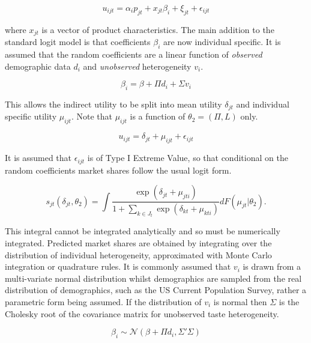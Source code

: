 \documentclass[parskip=half]{scrartcl}
\begin{document}
\begin{equation}
u_{ijt} = \alpha_i p_{jt} + x_{jt} \beta_i + \xi_{jt} + \epsilon_{ijt}
\end{equation}

where \(x_{jt}\) is a vector of product characteristics. The main addition to the standard logit model is that coefficients \(\beta_i\) are now individual specific. It is assumed that the random coefficients are a linear function of \emph{observed} demographic data \(d_i\) and \emph{unobserved} heterogeneity \(v_i\).

\begin{equation}
\beta_i = \beta + \Pi d_i + \Sigma v_i
\end{equation}

This allows the indirect utility to be split into mean utility \(\delta_{jt}\) and individual specific utility \(\mu_{ijt}\). Note that \(\mu_{ijt}\) is a function of \(\theta_2 = (\Pi, L)\) only.

\begin{equation}
u_{ijt} = \delta_{jt} + \mu_{ijt} + \epsilon_{ijt}
\end{equation}

It is assumed that \(\epsilon_{ijt}\) is of Type I Extreme Value, so that conditional on the random coefficients market shares follow the usual logit form.

\begin{equation}
\label{eq:market_share_integral}
s_{jt}(\delta_{jt}, \theta_2) = \int \frac{\exp(\delta_{jt} + \mu_{jti})}{1 + \sum_{k \in J_t} \exp(\delta_{kt} + \mu_{kti})} dF(\mu_{jt} | \theta_2).
\end{equation}

This integral cannot be integrated analytically and so must be numerically integrated. Predicted market shares are obtained by integrating over the distribution of individual heterogeneity, approximated with Monte Carlo integration or quadrature rules. It is commonly assumed that \(v_i\) is drawn from a multi-variate normal distribution whilst demographics are sampled from the real distribution of demographics, such as the US Current Population Survey, rather a parametric form being assumed. If the distribution of \(v_i\) is normal then \(\Sigma\) is the Cholesky root of the covariance matrix for unobserved taste heterogeneity.

\begin{equation}
\beta_i \sim \mathcal{N}(\beta + \Pi d_i, \Sigma'\Sigma)
\end{equation}
\end{document}
